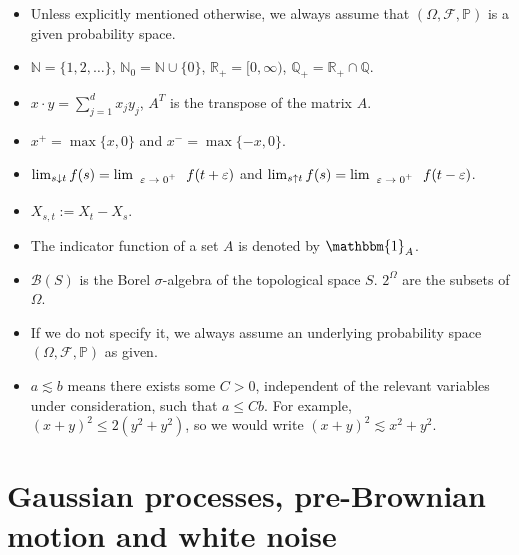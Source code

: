 \documentclass{article}
\newcommand{\coloneq}{:=}
\newcommand{\cdummy}{\cdot}
\newcommand{\tmscript}[1]{\text{\scriptsize{$#1$}}}
\newenvironment{itemizedot}{\begin{itemize} \renewcommand{\labelitemi}{$\bullet$}\renewcommand{\labelitemii}{$\bullet$}\renewcommand{\labelitemiii}{$\bullet$}\renewcommand{\labelitemiv}{$\bullet$}}{\end{itemize}}
\newcommand{\1}{\mathbbm{1}}
\begin{document}
\begin{itemizedot}
  \item Unless explicitly mentioned otherwise, we always assume that $(\Omega,
  \mathcal{F}, \mathbb{P})$ is a given probability space.

  \item $\mathbb{N}= \{1, 2, \ldots\}$, $\mathbb{N}_0 =\mathbb{N} \cup \{0\}$,
  $\mathbb{R}_+ = [0, \infty)$, $\mathbb{Q}_+ =\mathbb{R}_+ \cap \mathbb{Q}$.

  \item $x \cdummy y = \sum_{j = 1}^d x_j y_j$, $A^T$ is the transpose of the
  matrix $A$.

  \item $x^+ = \max \{ x, 0 \}$ and $x^- = \max \{ - x, 0 \}$.

  \item $\lim_{s \downarrow t} f (s) = \lim_{\tmscript{\begin{array}{c}
    \varepsilon \rightarrow 0^+
  \end{array}}} f (t + \varepsilon)$ and $\lim_{s \uparrow t} f (s) =
  \lim_{\tmscript{\begin{array}{c}
    \varepsilon \rightarrow 0^+
  \end{array}}} f (t - \varepsilon)$.

  \item $X_{s, t} \coloneq X_t - X_s$.

  \item The indicator function of a set $A$ is denoted by $\mathbbm{1}_A$.

  \item $\mathcal{B} (S)$ is the Borel $\sigma$-algebra of the topological
  space $S$. $2^{\Omega}$ are the subsets of $\Omega$.

  \item If we do not specify it, we always assume an underlying probability
  space $(\Omega, \mathcal{F}, \mathbb{P})$ as given.

  \item $a \lesssim b$ means there exists some $C > 0$, independent of the
  relevant variables under consideration, such that $a \leqslant Cb$. For
  example, $(x + y)^2 \leqslant 2 (y^2 + y^2)$, so we would write $(x + y)^2
  \lesssim x^2 + y^2$.
\end{itemizedot}

\section{Gaussian processes, pre-Brownian motion and white noise}
\end{document}
